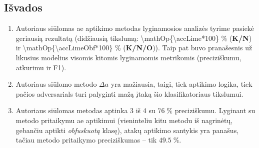 \subsection*{Išvados}

\begin{enumerate}
    \item Autoriaus siūlomas \gls{ae} aptikimo metodas lyginamosios analizės tyrime pasiekė geriausią rezultatą (didžiausią tikslumą: \num{\mathOp{\accLime*100}} \% (\textbf{K/N}) ir \num{\mathOp{\accLimeObf*100}} \% (\textbf{K/N/O})). Taip pat buvo pranašesnis už likusius modelius visomis kitomis lyginamomis metrikomis (preciziškumu, atkūrimu ir F1).
    \item Autoriaus siūlomo metodo $\Delta a$ yra mažiausia, taigi, tiek  aptikimo logika, tiek pačios \glspl{adversarial} turi palyginti mažą įtaką šio klasifikatoriaus tikslumui.
    \item Autoriaus siūlomas metodas aptinka 3 iš 4  su $\num{76}\;\%$ preciziškumu. Lyginant su \LIME metodo pritaikymu \gls{ae} aptikimui (vieninteliu kitu metodu iš nagrinėtų, gebančiu aptikti \textit{obfuskuotą} klasę), atakų aptikimo santykis yra panašus, tačiau \LIME metodo pritaikymo preciziškumas -- tik $\num{49,5}\;\%$.
\end{enumerate}



\addtocounter{footnote}{-2}
